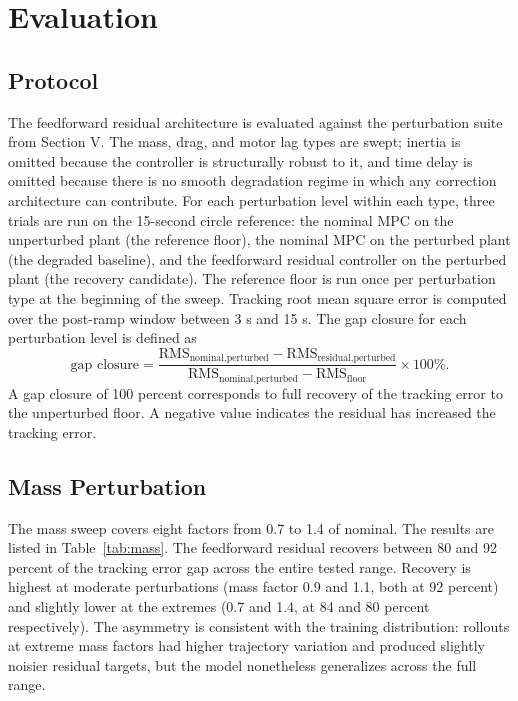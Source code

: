 \documentclass[conference]{IEEEtran}
\begin{document}
\section{Evaluation}

\subsection{Protocol}
The feedforward residual architecture is evaluated against the perturbation suite from Section V. The mass, drag, and motor lag types are swept; inertia is omitted because the controller is structurally robust to it, and time delay is omitted because there is no smooth degradation regime in which any correction architecture can contribute. For each perturbation level within each type, three trials are run on the 15-second circle reference: the nominal MPC on the unperturbed plant (the reference floor), the nominal MPC on the perturbed plant (the degraded baseline), and the feedforward residual controller on the perturbed plant (the recovery candidate). The reference floor is run once per perturbation type at the beginning of the sweep. Tracking root mean square error is computed over the post-ramp window between 3 s and 15 s. The gap closure for each perturbation level is defined as
\begin{equation}
\text{gap closure} = \frac{\text{RMS}_{\text{nominal,perturbed}} - \text{RMS}_{\text{residual,perturbed}}}{\text{RMS}_{\text{nominal,perturbed}} - \text{RMS}_{\text{floor}}} \times 100\%.
\end{equation}
A gap closure of 100 percent corresponds to full recovery of the tracking error to the unperturbed floor. A negative value indicates the residual has increased the tracking error.

\subsection{Mass Perturbation}
The mass sweep covers eight factors from 0.7 to 1.4 of nominal. The results are listed in Table~\ref{tab:mass}. The feedforward residual recovers between 80 and 92 percent of the tracking error gap across the entire tested range. Recovery is highest at moderate perturbations (mass factor 0.9 and 1.1, both at 92 percent) and slightly lower at the extremes (0.7 and 1.4, at 84 and 80 percent respectively). The asymmetry is consistent with the training distribution: rollouts at extreme mass factors had higher trajectory variation and produced slightly noisier residual targets, but the model nonetheless generalizes across the full range.
\end{document}

